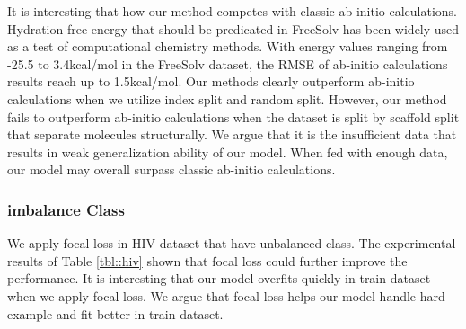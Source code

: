 \documentclass[letterpaper]{article} \usepackage{aaai18}  \usepackage{times}  \usepackage{helvet}  \usepackage{courier}  \usepackage{url}  \usepackage{graphicx}  \usepackage{amsmath}
\begin{document}
It is interesting that how our method competes with classic ab-initio calculations. Hydration free energy that should be predicated in FreeSolv has been widely used as a test of computational chemistry methods. With energy values ranging from -25.5 to 3.4kcal/mol in the FreeSolv dataset, the RMSE of ab-initio calculations results reach up to 1.5kcal/mol\cite{Mobley2014Blind}. Our methods clearly outperform ab-initio calculations when we utilize index split and random split. However, our method fails to outperform ab-initio calculations when the dataset is split by scaffold split that separate molecules structurally. We argue that it is the insufficient data that results in weak generalization ability of our model. When fed with enough data, our model may overall surpass classic ab-initio calculations.



\subsubsection{imbalance Class} We apply focal loss in HIV dataset that have unbalanced class. The experimental results of Table \ref{tbl::hiv} shown that focal loss could further improve the performance. It is interesting that our model overfits quickly in train dataset when we apply focal loss. We argue that focal loss helps our model handle hard example and fit better in train dataset.





\iffalse

\definecolor{bblue}{HTML}{4F81BD}
\definecolor{rred}{HTML}{C0504D}
\definecolor{ggreen}{HTML}{9BBB59}
\definecolor{ppurple}{HTML}{9F4C7C}

\begin{tikzpicture}
    \begin{axis}[
        width  = 0.5*\textwidth,
        height = 14cm,
        major y tick style = transparent,
        xbar,
        bar width=5pt,
        xmajorgrids = true,
        xlabel = {AUC},
        symbolic y coords={a,b,c,d,e,f,g,h,i,j,k,l,m,n,o,p,q},
        ytick = data,
        scaled x ticks = false,
    ]
        \addplot[style={bblue,fill=bblue,mark=none}]
            coordinates {(0.657,a) (0.972,b) (0.974,c) (0.854,d) (0.534,e) (0.878,f) (0.431,g) (0.869,h) (0.704,i) (0.806,j) (0.756,k) (0.831,l) (0.908,m) (1.0,n) (0.970,o) (0.670,p) (0.705,q) };

        \addplot[style={rred,fill=rred,mark=none}]
             coordinates {(0.512,a) (0.995,b) (0.908,c) (0.929,d) (0.704,e) (0.935,f) (0.271,g) (0.870,h) (0.883,i) (0.866,j) (0.756,k) (0.929,l) (0.955,m) (1.0,n) (0.982,o) (0.631,p) (0.837,q)};

        \legend{Baseline, Focal Loss}
    \end{axis}
\end{tikzpicture}
\fi
\end{document}
